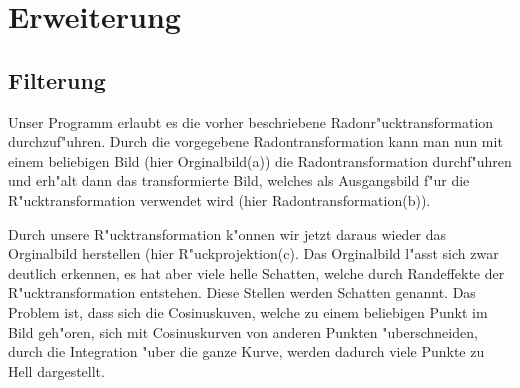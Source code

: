\section{Erweiterung}
\subsection{Filterung}


Unser Programm erlaubt es die vorher beschriebene Radonr"ucktransformation
durchzuf"uhren. Durch die vorgegebene Radontransformation kann man nun
mit einem beliebigen Bild (hier Orginalbild(a)) die Radontransformation
durchf"uhren und erh"alt dann das transformierte Bild, welches
als Ausgangsbild f"ur die R"ucktransformation verwendet wird (hier
Radontransformation(b)).

\begin{figure}[ht!]\centering
\end{figure}

Durch unsere R"ucktransformation k"onnen wir jetzt daraus wieder das
Orginalbild herstellen (hier R"uckprojektion(c). Das Orginalbild l"asst
sich zwar deutlich erkennen, es hat aber viele helle Schatten, welche
durch Randeffekte der R"ucktransformation entstehen. Diese Stellen werden
Schatten genannt. Das Problem ist, dass sich die Cosinuskuven, welche
zu einem beliebigen Punkt im Bild geh"oren, sich mit Cosinuskurven von
anderen Punkten "uberschneiden, durch die Integration "uber die ganze
Kurve, werden dadurch viele Punkte zu Hell dargestellt.

